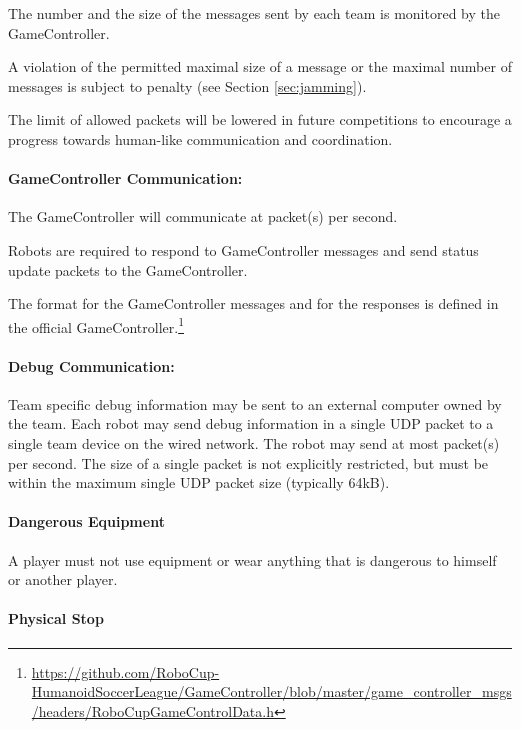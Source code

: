 The number and the size of the messages sent by each team is monitored by the GameController.

A violation of the permitted maximal size of a message or the maximal number of messages is subject to penalty (see Section \ref{sec:jamming}).

The limit of allowed packets will be lowered in future competitions to encourage a progress towards human-like communication and coordination.


\paragraph{GameController Communication:}

The GameController will communicate at \GameControllerPacketRate{} packet(s) per second.

Robots are required to respond to GameController messages and send status update packets to the GameController.

The format for the GameController messages and for the responses is defined in the official GameController.\footnote{\url{https://github.com/RoboCup-HumanoidSoccerLeague/GameController/blob/master/game_controller_msgs/headers/RoboCupGameControlData.h}}


\paragraph{Debug Communication:}

%
Team specific debug information may be sent to an external computer owned by the team. 
Each robot may send debug information in a single UDP packet to a single team device on the wired network.
The robot may send at most \UDPDebugPacketRate{} packet(s) per second.
The size of a single packet is not explicitly restricted, but must be within the maximum single UDP packet size (typically 64kB).



\label{sec:robot_safety}

\paragraph{Dangerous Equipment}
A player must not use equipment or wear anything that is dangerous to himself or another player.


\paragraph{Physical Stop}

